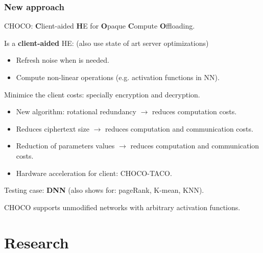 \documentclass[10pt]{beamer}
\begin{document}
\begin{frame}
\frametitle{New approach}
    \vspace{-0.2cm}
CHOCO: \textbf{C}lient-aided \textbf{H}E for \textbf{O}paque \textbf{C}ompute \textbf{O}ffloading.

    \vspace{-0.2cm}
    Is a \textbf{client-aided} HE: (also use state of art server optimizations)
\pause
    \vspace{-0.4cm}
\begin{itemize}\itemsep-0.7em
    \item Refresh noise when is needed.
    \item Compute non-linear operations (e.g. activation functions in NN).
\end{itemize}

\pause
    Minimice the client costs: specially encryption and decryption.
    \vspace{-0.2cm}
\begin{itemize}\itemsep-0.7em
    \item New algorithm: rotational redundancy $\rightarrow$ reduces computation costs.
    \item Reduces ciphertext size $\rightarrow$ reduces computation and communication costs.
\pause
    \item Reduction of parameters values $\rightarrow$ reduces computation and communication costs.
    \item Hardware acceleration for client: CHOCO-TACO.
\end{itemize}
\pause
    Testing case: \textbf{DNN} (also shows for: pageRank, K-mean, KNN).

    CHOCO supports unmodified networks with arbitrary activation functions.

\end{frame}



\section{Research}
\end{document}
